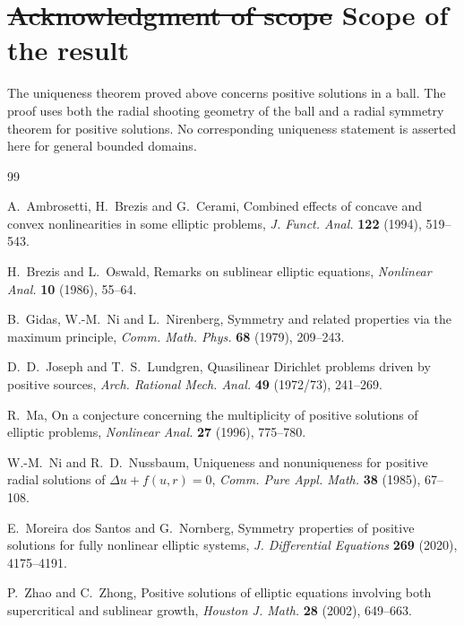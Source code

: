 \documentclass[11pt]{article}
\newcommand{\add}[1]{{\color{blue}#1}}
\newcommand{\del}[1]{{\color{red}\sout{#1}}}
\newcommand{\oldrev}[1]{#1}
\theoremstyle{definition}
\begin{document}


\section*{\del{Acknowledgment of scope} \add{Scope of the result}}

The uniqueness theorem proved above concerns positive solutions in a
ball. The proof uses both the radial shooting geometry of the ball and
a radial symmetry theorem for positive solutions. No corresponding
uniqueness statement is asserted here for general bounded domains.

\begin{thebibliography}{99}

A.~Ambrosetti, H.~Brezis and G.~Cerami,
\newblock Combined effects of concave and convex nonlinearities in some elliptic problems,
\newblock \emph{J. Funct. Anal.} \textbf{122} (1994), 519--543.

{\color{blue}
H.~Brezis and L.~Oswald,
\newblock Remarks on sublinear elliptic equations,
\newblock \emph{Nonlinear Anal.} \textbf{10} (1986), 55--64.
}

B.~Gidas, W.-M.~Ni and L.~Nirenberg,
\newblock Symmetry and related properties via the maximum principle,
\newblock \emph{Comm. Math. Phys.} \textbf{68} (1979), 209--243.

{\color{blue}
D.~D.~Joseph and T.~S.~Lundgren,
\newblock Quasilinear Dirichlet problems driven by positive sources,
\newblock \emph{Arch. Rational Mech. Anal.} \textbf{49} (1972/73), 241--269.
}

R.~Ma,
\newblock On a conjecture concerning the multiplicity of positive solutions of elliptic problems,
\newblock \emph{Nonlinear Anal.} \textbf{27} (1996), 775--780.

W.-M.~Ni and R.~D.~Nussbaum,
\newblock Uniqueness and nonuniqueness for positive radial solutions of
$\Delta u+f(u,r)=0$,
\newblock \emph{Comm. Pure Appl. Math.} \textbf{38} (1985), 67--108.

E.~Moreira dos Santos and G.~Nornberg,
\newblock Symmetry properties of positive solutions for fully nonlinear elliptic systems,
\newblock \emph{J. Differential Equations} \textbf{269} (2020), 4175--4191.
\oldrev{
P.~Zhao and C.~Zhong,
\newblock Positive solutions of elliptic equations involving both
supercritical and sublinear growth,
\newblock \emph{Houston J. Math.} \textbf{28} (2002), 649--663.
}

\end{thebibliography}
\end{document}
